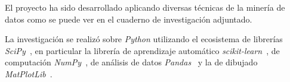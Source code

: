 
El proyecto ha sido desarrollado aplicando diversas técnicas de la minería de datos como se puede ver en el cuaderno de investigación adjuntado.


La investigación se realizó sobre \textit{Python} utilizando el ecosistema de librerías \textit{SciPy}~\cite{tool:scipy}, en particular la librería de aprendizaje automático \textit{scikit-learn}~\cite{tool:scikit-learn}, de computación \textit{NumPy}~\cite{tool:numpy}, de análisis de datos \textit{Pandas}~\cite{tool:pandas} y la de dibujado \textit{MatPlotLib}~\cite{tool:matplotlib}.


